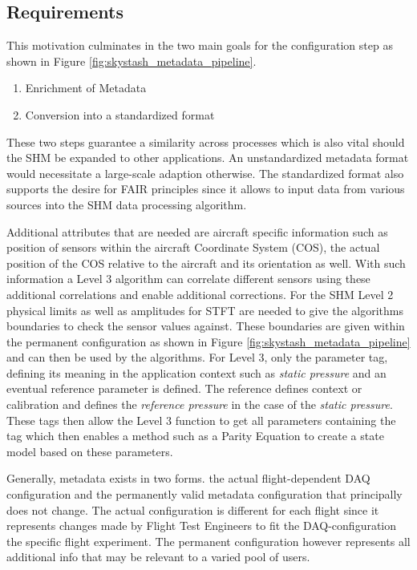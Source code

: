 \subsection{Requirements}

This motivation culminates in the two main goals for the configuration step as shown in Figure \ref{fig:skystash_metadata_pipeline}.
\begin{enumerate}
    \item Enrichment of Metadata
    \item Conversion into a standardized format
\end{enumerate}
These two steps guarantee a similarity across processes which is also vital should the SHM be expanded to other applications. An unstandardized metadata format would necessitate a large-scale adaption otherwise. The standardized format also supports the desire for FAIR principles since it allows to input data from various sources into the SHM data processing algorithm.

Additional attributes that are needed are aircraft specific information such as position of sensors within the aircraft Coordinate System (COS), the actual position of the COS relative to the aircraft and its orientation as well. With such information a Level 3 algorithm can correlate different sensors using these additional correlations and enable additional corrections.
For the SHM Level 2 physical limits as well as amplitudes for STFT are needed to give the algorithms boundaries to check the sensor values against. These boundaries are given within the permanent configuration as shown in Figure \ref{fig:skystash_metadata_pipeline} and can then be used by the algorithms. For Level 3, only the parameter tag, defining its meaning in the application context such as \textit{static pressure} and an eventual reference parameter is defined. The reference defines context or calibration and defines the \textit{reference pressure} in the case of the \textit{static pressure}. These tags then allow the Level 3 function to get all parameters containing the tag which then enables a method such as a Parity Equation to create a state model based on these parameters.

Generally, metadata exists in two forms. the actual flight-dependent DAQ configuration and the permanently valid metadata configuration that principally does not change. The actual configuration is different for each flight since it represents changes made by Flight Test Engineers to fit the DAQ-configuration the specific flight experiment. The permanent configuration however represents all additional info that may be relevant to a varied pool of users.


